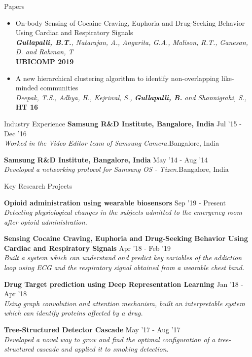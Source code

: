 \documentclass{resume} %
\begin{document}
\vspace*{-1.5mm}
\begin{rSection}{Papers}
\begin{itemize}[leftmargin=*]
\item On-body Sensing of Cocaine Craving, Euphoria and Drug-Seeking Behavior Using Cardiac and Respiratory Signals \\ \textit{\textbf{Gullapalli, B.T.},  Natarajan, A., Angarita, G.A., Malison, R.T., Ganesan, D. and Rahman, T} \\ \textbf{UBICOMP 2019} 
\item A new hierarchical clustering algorithm to identify non-overlapping like-minded communities \\ \textit{Deepak, T.S., Adhya, H., Kejriwal, S., \textbf{Gullapalli, B.} and Shannigrahi, S.,} \\ \textbf{HT 16} 


\end{itemize}
\end{rSection}
\vspace*{-1.5mm}
\begin{rSection}{Industry Experience}
{\bf Samsung R\&D Institute, Bangalore, India}{ \hfill Jul '15 - Dec '16}\\ \textit{Worked in the Video Editor team of Samsung Camera.}{\hfill Bangalore, India}

{\bf Samsung R\&D Institute, Bangalore, India}{ \hfill May '14 - Aug '14}\\ \textit{Developed a networking protocol for Samsung OS - Tizen.}{\hfill Bangalore, India}
\end{rSection}
\vspace*{-1.5mm}
\begin{rSection}{Key Research Projects}

{\bf Opioid administration using wearable biosensors}{ \hfill Sep '19 - Present }\\ \textit{Detecting physiological changes in the subjects admitted to the emergency room after opioid administration. }

{\bf Sensing Cocaine Craving, Euphoria and Drug-Seeking Behavior Using Cardiac and Respiratory Signals}{ \hfill Apr '18 - Feb '19}\\ \textit{Built a system which can understand and predict key variables of the addiction loop using ECG and the respiratory signal obtained from a wearable chest band.}

{\bf Drug Target prediction using Deep Representation Learning}{ \hfill Jan '18 - Apr '18}\\ \textit{Using graph convolution and attention mechanism, built an interpretable system which can identify proteins affected by a drug.}

{\bf Tree-Structured Detector Cascade}{ \hfill May '17 - Aug '17}\\ \textit{Developed a novel way to grow and find the optimal configuration of a tree-structured cascade and applied it to smoking detection.  }

\end{rSection}
\end{document}
